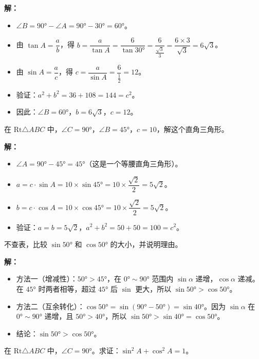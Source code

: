 \documentclass[12pt, a4paper]{ctexart}
\begin{document}
\textbf{解：}
\begin{itemize}[nosep]
  \item $\angle B=90°-\angle A=90°-30°=60°$。
  \item 由 $\tan A=\dfrac{a}{b}$，得 $b=\dfrac{a}{\tan A}=\dfrac{6}{\tan30°}=\dfrac{6}{\frac{\sqrt{3}}{3}}=\dfrac{6\times3}{\sqrt{3}}=6\sqrt{3}$。
  \item 由 $\sin A=\dfrac{a}{c}$，得 $c=\dfrac{a}{\sin A}=\dfrac{6}{\frac{1}{2}}=12$。
  \item 验证：$a^2+b^2=36+108=144=c^2$。\checkmark
  \item 因此：$\angle B=60°$，$b=6\sqrt{3}$，$c=12$。
\end{itemize}

\begin{examplebox}
在 $\text{Rt}\triangle ABC$ 中，$\angle C=90°$，$\angle B=45°$，$c=10$，解这个直角三角形。
\end{examplebox}

\textbf{解：}
\begin{itemize}[nosep]
  \item $\angle A=90°-45°=45°$（这是一个等腰直角三角形）。
  \item $a=c\cdot\sin A=10\times\sin45°=10\times\dfrac{\sqrt{2}}{2}=5\sqrt{2}$。
  \item $b=c\cdot\cos A=10\times\cos45°=10\times\dfrac{\sqrt{2}}{2}=5\sqrt{2}$。
  \item 验证：$a=b=5\sqrt{2}$，$a^2+b^2=50+50=100=c^2$。\checkmark
\end{itemize}

\begin{examplebox}[【例题6】比较三角函数值的大小]
不查表，比较 $\sin 50°$ 和 $\cos 50°$ 的大小，并说明理由。
\end{examplebox}

\textbf{解：}
\begin{itemize}[nosep]
  \item 方法一（增减性）：$50°>45°$，在 $0°\sim90°$ 范围内 $\sin\alpha$ 递增，$\cos\alpha$ 递减。在 $45°$ 时两者相等，超过 $45°$ 后 $\sin$ 更大，所以 $\sin50°>\cos50°$。
  \item 方法二（互余转化）：$\cos50°=\sin(90°-50°)=\sin40°$。因为 $\sin\alpha$ 在 $0°\sim90°$ 递增，且 $50°>40°$，所以 $\sin50°>\sin40°=\cos50°$。
  \item 结论：$\boxed{\sin50°>\cos50°}$。
\end{itemize}

\begin{examplebox}
在 $\text{Rt}\triangle ABC$ 中，$\angle C=90°$。求证：$\sin^2 A+\cos^2 A=1$。
\end{examplebox}
\end{document}
